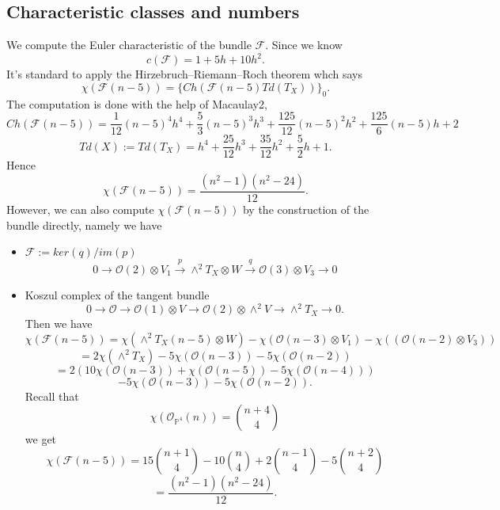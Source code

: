 \documentclass[../main.tex]{subfiles}
\begin{document}
\subsection{Characteristic classes and numbers}
\begin{example}
We compute the Euler characteristic of the bundle $\mathscr{F}$. Since we know 
$$c(\mathscr{F})=1+5h+10h^{2}.$$
It's standard to apply the Hirzebruch–Riemann–Roch theorem whch says
$$\chi(\mathscr{F}(n-5))=\{Ch(\mathscr{F}(n-5)Td(T_{X}))\}_{0}.$$
The computation is done with the help of Macaulay2,
$$Ch(\mathscr{F}(n-5))=\frac{1}{12}(n-5)^{4}h^{4}+\frac{5}{3}(n-5)^{3}h^{3}+\frac{125}{12}(n-5)^{2}h^{2}+\frac{125}{6}(n-5)h+2$$
$$Td(X):=Td(T_{X})=h^{4}+\frac{25}{12} h^{3}+\frac{35}{12} h^{2}+\frac{5}{2} h+1.$$
Hence 
$$\chi(\mathscr{F}(n-5))=\frac{(n^{2}-1)(n^{2}-24)}{12}.$$
However, we can also compute $\chi(\mathscr{F}(n-5))$ by the construction of the bundle directly, namely we have
\begin{itemize}
\item $\mathscr{F}:=ker(q)/im(p)$
$$0\rightarrow \mathcal{O}(2)\otimes V_{1}\xrightarrow{p} \wedge^{2}T_{X}\otimes W\xrightarrow{q} \mathcal{O}(3)\otimes V_{3}\rightarrow 0$$
\item Koszul complex of the tangent bundle
$$0\rightarrow \mathcal{O}\rightarrow \mathcal{O}(1)\otimes V\rightarrow \mathcal{O}(2)\otimes \wedge^{2}V\rightarrow \wedge^{2}T_{X}\rightarrow 0.$$
Then we have 
$$\chi(\mathscr{F}(n-5))=\chi(\wedge^{2}T_{X}(n-5)\otimes W)-\chi(\mathcal{O}(n-3)\otimes V_{1})-\chi((\mathcal{O}(n-2)\otimes V_{3}))$$
$$=2\chi(\wedge^{2}T_{X})-5\chi(\mathcal{O}(n-3))-5\chi(\mathcal{O}(n-2))$$
$$=2(10\chi(\mathcal{O}(n-3))+\chi(\mathcal{O}(n-5))-5\chi(\mathcal{O}(n-4)))$$
$$-5\chi(\mathcal{O}(n-3))-5\chi(\mathcal{O}(n-2)).$$
Recall that 
$$\chi(\mathcal{O}_{\mathbb{P}^{4}}(n))=\binom{n+4}{4}$$
we get 
$$\chi(\mathscr{F}(n-5))=15\binom{n+1}{4}-10\binom{n}{4}+2\binom{n-1}{4}-5\binom{n+2}{4}$$
$$=\frac{(n^{2}-1)(n^{2}-24)}{12}.$$
\end{itemize}
\end{example}
\end{document}

